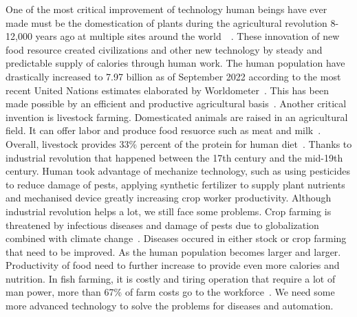 One of the most critical improvement of technology human beings have ever made must be the domestication of plants during the agricultural revolution 8-12,000 years ago at multiple sites around the world~\cite{agri-wiki}~\cite{agri-history}. These innovation of new food resource created civilizations and other new technology by steady and predictable supply of calories through human work. The human population have drastically increased to 7.97 billion as of September 2022 according to the most recent United Nations estimates elaborated by Worldometer~\cite{argi-pop}. This has been made possible by an efficient and productive agricultural basis~\cite{agri-pop2}.
Another critical invention is livestock farming. Domesticated animals are raised in an agricultural field. It can offer labor and produce food resuorce such as meat and milk~\cite{agri-stock}. Overall, livestock provides 33\% percent of the protein for human diet~\cite{agri-stock2}.
Thanks to industrial revolution that happened between the 17th century and the mid-19th century. Human took advantage of mechanize technology, such as using pesticides to reduce damage of pests, applying synthetic fertilizer to supply plant nutrients and mechanised device greatly increasing crop worker productivity. Although industrial revolution helps a lot, we still face some problems. Crop farming is threatened by infectious diseases and damage of pests due to globalization combined with climate change~\cite{crop-fail}. Diseases occured in either stock or crop farming that need to be improved. As the human population becomes larger and larger. Productivity of food need to further increase to provide even more calories and nutrition. In fish farming, it is costly and tiring operation that require a lot of man power, more than 67\% of farm costs go to the workforce~\cite{fish-labour}. We need some more advanced technology to solve the problems for diseases and automation.

